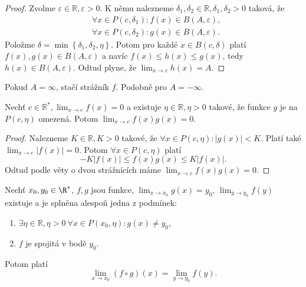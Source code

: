 \begin{proof}
	Zvolme $\varepsilon \in \mathbb R , \varepsilon > 0$. K němu nalezneme $\delta_1, \delta_2 \in \mathbb R , \delta_1, \delta_2 > 0$
	taková, že
	\begin{align*}
		& \forall x \in P(c,\delta_1):f(x)\in B(A, \varepsilon), \\
		& \forall x \in P(c,\delta_2):g(x)\in B(A, \varepsilon).
\end{align*}
    Položme $\delta = \min \left \{ \delta_1, \delta_2,\eta \right \} $. Potom pro každé
    $x \in B(c,\delta)$ platí $f(x), g(x)\in B(A, \varepsilon)$ a navíc $f(x)\leq h(x)\leq g(x)$,
    tedy $h(x) \in B(A, \varepsilon)$. Odtud plyne, že $\lim_{x\to c} h(x) = A.$
\end{proof}

\begin{poznamka}
	Pokud $A = \infty$, stačí strážník $f$. Podobně pro $A = -\infty$.
\end{poznamka}

\begin{dusledek}
	Nechť $c \in \mathbb R ^*, \lim _{x\to c} f(x) = 0$ a existuje $\eta \in \mathbb R ,\eta > 0$
	takové, že funkce $g$ je na $P(c,\eta)$ omezená. Potom $\lim_{x\to c} f(x)g(x)=0.$
\end{dusledek}

\begin{proof}
	Nalezneme $K\in \mathbb R , K > 0$ takové, že $\forall x \in P(c,\eta): |g(x)| <K$.
	Platí také $\lim_{x\to c} |f(x)|=0.$ Potom $\forall x \in P(c, \eta)$ platí
	$$
	    -K |f(x)| \leq f(x)g(x) \leq K|f(x)|.
	$$
	Odtud podle věty o dvou strážnících máme $\lim_{x\to c} f(x)g(x) = 0.$
\end{proof}

\begin{veta} \label{veta3.7}
Nechť $x_0,y_0\in\R^*$, $f,g$ jsou funkce, $\lim_{x\to x_0} g(x)=y_0$, $\lim_{y\to y_0} f(y)$ existuje a je splněna alespoň jedna z podmínek:
\begin{enumerate}
	\item[(P)] $\exists\eta \in \mathbb R , \eta >0\ \forall x\in P(x_0,\eta): g(x)\ne y_0$,
	\item[(S)] $f$ je spojitá v bodě $y_0$.
\end{enumerate}
Potom platí $$\lim_{x\to x_0} (f\circ g)(x)=\lim_{y\to y_0} f(y).$$
\end{veta}

